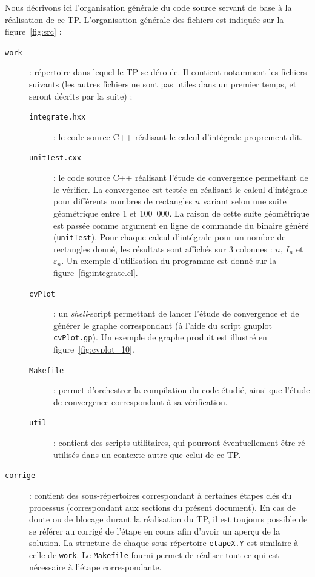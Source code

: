 \documentclass[a4paper]{article}
\begin{document}
Nous décrivons ici l'organisation générale du code source servant de base à la
réalisation de ce TP. L'organisation générale des fichiers est indiquée sur la
figure~\ref{fig:src} :
\begin{description}
\item[\tt work]: répertoire dans lequel le TP se déroule. Il contient notamment
  les fichiers suivants (les autres fichiers ne sont pas utiles dans un premier
  temps, et seront décrits par la suite) :
  \begin{description}
  \item[\tt integrate.hxx]: le code source C++ réalisant le calcul d'intégrale
    proprement dit.
  \item[\tt unitTest.cxx]: le code source C++ réalisant l'étude de convergence
    permettant de le vérifier. La convergence est testée en réalisant le calcul
    d'intégrale pour différents nombres de rectangles $n$ variant selon une
    suite géométrique entre 1 et 100~000. La raison de cette suite géométrique
    est passée comme argument en ligne de commande du binaire généré
    (\texttt{unitTest}). Pour chaque calcul d'intégrale pour un nombre de
    rectangles donné, les résultats sont affichés sur 3 colonnes : $n$, $I_n$
    et~$\varepsilon_n$. Un exemple d'utilisation du programme est donné sur la
    figure~\ref{fig:integrate.cl}.
  \item[\tt cvPlot]: un \textit{shell}-script permettant de lancer l'étude de
    convergence et de générer le graphe correspondant (à l'aide du script
    gnuplot \texttt{cvPlot.gp}). Un exemple de graphe produit est illustré en
    figure~\ref{fig:cvplot_10}.
  \item[\tt Makefile]: permet d'orchestrer la compilation du code étudié,
    ainsi que l'étude de convergence correspondant à sa vérification. 
  \item[\tt util]: contient des scripts utilitaires, qui pourront éventuellement
    être ré-utilisés dans un contexte autre que celui de ce TP.
  \end{description}
\item[\tt corrige]: contient des sous-répertoires correspondant à certaines
  étapes clés du processus (correspondant aux sections du présent document). En
  cas de doute ou de blocage durant la réalisation du TP, il est toujours
  possible de se référer au corrigé de l'étape en cours afin d'avoir un aperçu
  de la solution. La structure de chaque sous-répertoire \texttt{etapeX.Y} est
  similaire à celle de \texttt{work}. Le \texttt{Makefile} fourni permet de
  réaliser tout ce qui est nécessaire à l'étape correspondante.
\end{description}
\end{document}
